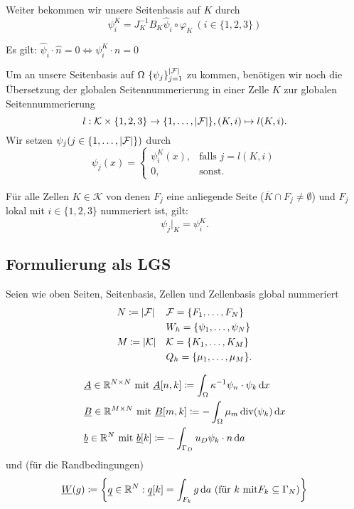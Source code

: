 Weiter bekommen wir unsere Seitenbasis auf $ K $ durch 
\[ \psi_i^K = J_K^{-1}B_K \hat{\psi}_i \circ \varphi_K \ (i\in \{1,2,3\}) \]
\begin{remark}
	Es gilt: $ \hat{\psi}_i \cdot \hat{n} = 0 \iff \psi_i^K \cdot n = 0 $
\end{remark}
Um  an unsere Seitenbasis auf $ \Omega \ \{\psi_j\}_{j = 1}^{\abs{\mathcal{F}}}$ zu kommen, benötigen wir noch die Übersetzung der globalen Seitennummerierung in einer Zelle $ K $ zur globalen Seitennummerierung
\[ l:\mathcal{K}\times \{1,2,3\} \to \{1, \dots , \abs{\mathcal{F}} \}, (K,i) \mapsto l(K,i). \]
Wir setzen $ \psi_j (j \in \{1,\dots , \abs{\mathcal{F}}\})$ durch
\[ \psi_j(x) = 
\begin{cases}
	\psi_i^K(x) , &\text{falls } j = l(K,i)\\
	0,			  &\text{sonst}.
\end{cases} \]
\begin{remark}
	Für alle Zellen $ K \in \mathcal{K} $ von denen $ F_j $ eine anliegende Seite ($ \overline{K} \cap F_j \ne \emptyset $) und $ F_j $ lokal mit $ i \in \{1,2,3\} $ nummeriert ist, gilt:
	\[ \psi_j|_K = \psi_i^K. \]
\end{remark}

\subsection{Formulierung als LGS}
Seien wie oben Seiten, Seitenbasis, Zellen und Zellenbasis global nummeriert 
\begin{align*}
&N \coloneqq \abs{\mathcal{F}} &&\mathcal{F} = \{F_1, \dots , F_{N} \}  \\
&&&W_h =\{\psi_1, \dots , \psi_N\}\\
&M \coloneqq \abs{\mathcal{K}} &&\mathcal{K} = \{K_1, \dots , K_{M} \}  \\
&&&Q_h = \{\mu_1 , \dots , \mu_M  \}.
\end{align*}

\begin{define}
	\begin{align*}
		&\underline{A} \in \mathbb{R}^{N \times N} \text{ mit } \underline{A}[n,k] \coloneqq \int_{\Omega} \kappa^{-1} \psi_n \cdot \psi_k \mathop{}\!\mathrm{d} x \\
		&\underline{B} \in \mathbb{R}^{M \times N} \text{ mit } \underline{B}[m,k] \coloneqq - \int_{\Omega} \mu_m \operatorname{div}(\psi_k) \mathop{}\!\mathrm{d} x \\
		&\underline{b} \in \mathbb{R}^N \text{ mit } \underline{b}[k] \coloneqq - \int_{\Gamma_D} u_D \psi_k \cdot n \mathop{}\!\mathrm{d} a
	\end{align*}
	und (für die Randbedingungen)
	\begin{gather*}
		\underline{W}(g) \coloneqq \left\{ \underline{q} \in \mathbb{R}^N : \underline{q}[k] = \int_{F_k} g  \mathop{}\!\mathrm{d} a \ (\text{für } k \text{ mit} F_k \subseteq \Gamma_N) \right\} 
	\end{gather*}
\end{define}


